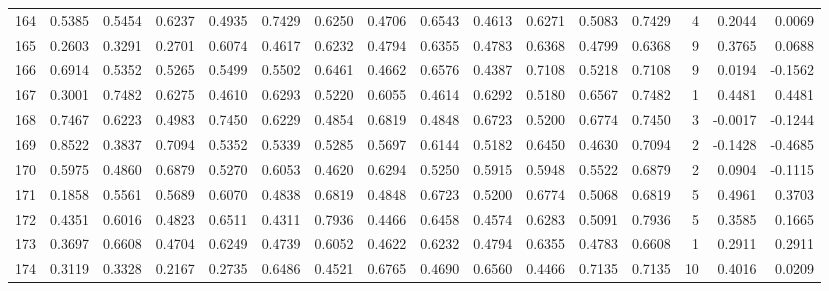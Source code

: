 \begin{tabular}{lrrrrrrrrrrrrrrr}
164 &      0.5385 &  0.5454 &  0.6237 &  0.4935 &  0.7429 &  0.6250 &  0.4706 &  0.6543 &  0.4613 &  0.6271 &   0.5083 &     0.7429 &      4 &                    0.2044 &                     0.0069 \\
165 &      0.2603 &  0.3291 &  0.2701 &  0.6074 &  0.4617 &  0.6232 &  0.4794 &  0.6355 &  0.4783 &  0.6368 &   0.4799 &     0.6368 &      9 &                    0.3765 &                     0.0688 \\
166 &      0.6914 &  0.5352 &  0.5265 &  0.5499 &  0.5502 &  0.6461 &  0.4662 &  0.6576 &  0.4387 &  0.7108 &   0.5218 &     0.7108 &      9 &                    0.0194 &                    -0.1562 \\
167 &      0.3001 &  0.7482 &  0.6275 &  0.4610 &  0.6293 &  0.5220 &  0.6055 &  0.4614 &  0.6292 &  0.5180 &   0.6567 &     0.7482 &      1 &                    0.4481 &                     0.4481 \\
168 &      0.7467 &  0.6223 &  0.4983 &  0.7450 &  0.6229 &  0.4854 &  0.6819 &  0.4848 &  0.6723 &  0.5200 &   0.6774 &     0.7450 &      3 &                   -0.0017 &                    -0.1244 \\
169 &      0.8522 &  0.3837 &  0.7094 &  0.5352 &  0.5339 &  0.5285 &  0.5697 &  0.6144 &  0.5182 &  0.6450 &   0.4630 &     0.7094 &      2 &                   -0.1428 &                    -0.4685 \\
170 &      0.5975 &  0.4860 &  0.6879 &  0.5270 &  0.6053 &  0.4620 &  0.6294 &  0.5250 &  0.5915 &  0.5948 &   0.5522 &     0.6879 &      2 &                    0.0904 &                    -0.1115 \\
171 &      0.1858 &  0.5561 &  0.5689 &  0.6070 &  0.4838 &  0.6819 &  0.4848 &  0.6723 &  0.5200 &  0.6774 &   0.5068 &     0.6819 &      5 &                    0.4961 &                     0.3703 \\
172 &      0.4351 &  0.6016 &  0.4823 &  0.6511 &  0.4311 &  0.7936 &  0.4466 &  0.6458 &  0.4574 &  0.6283 &   0.5091 &     0.7936 &      5 &                    0.3585 &                     0.1665 \\
173 &      0.3697 &  0.6608 &  0.4704 &  0.6249 &  0.4739 &  0.6052 &  0.4622 &  0.6232 &  0.4794 &  0.6355 &   0.4783 &     0.6608 &      1 &                    0.2911 &                     0.2911 \\
174 &      0.3119 &  0.3328 &  0.2167 &  0.2735 &  0.6486 &  0.4521 &  0.6765 &  0.4690 &  0.6560 &  0.4466 &   0.7135 &     0.7135 &     10 &                    0.4016 &                     0.0209 \\

\end{tabular}
